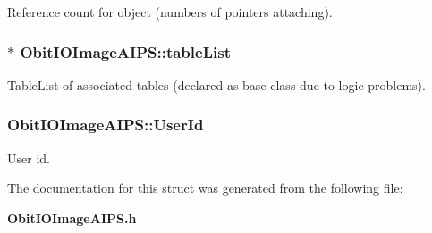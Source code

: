 Reference count for object (numbers of pointers attaching). 

\subsubsection{$\ast$ {\bf Obit\-IOImage\-AIPS::table\-List}}\label{structObitIOImageAIPS_o9}


Table\-List of associated tables (declared as base class due to logic problems). 

\subsubsection{ {\bf Obit\-IOImage\-AIPS::User\-Id}}\label{structObitIOImageAIPS_o11}


User id. 



The documentation for this struct was generated from the following file:\begin{CompactItemize}
\item 
{\bf Obit\-IOImage\-AIPS.h}\end{CompactItemize}
